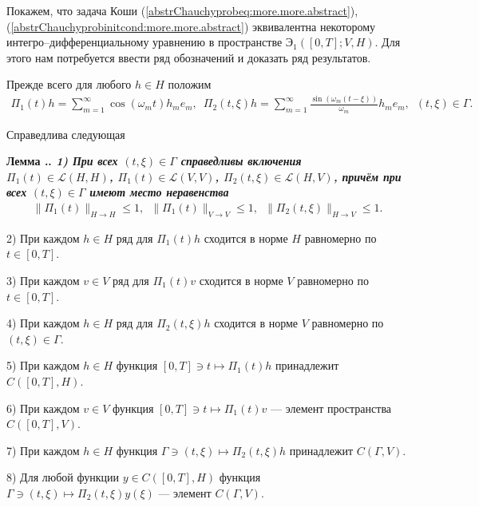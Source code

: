 \documentclass{report}
\newcounter{lem}[section]
\renewcommand{\thelem}{\thesection.\arabic{lem}}
\newenvironment{Lemma}{\par\refstepcounter{lem}\bf Лемма \thelem. \it}{\rm\par}
\begin{document}
Покажем, что задача Коши (\ref{abstrChauchyprobeq:more.more.abstract}), (\ref{abstrChauchyprobinitcond:more.more.abstract}) эквивалентна некоторому интегро--дифференциальному уравнению в
пространстве ${\textbf{Э}}_1([0,T];V,H)$. Для этого нам потребуется ввести ряд обозначений и доказать ряд результатов.

Прежде всего для любого $h\in H$ положим
\begin{gather*}
\Pi_1(t)h=\sum\limits_{m=1}^\infty\cos(\omega_mt)h_me_m,\,\,\,\Pi_2(t,\xi)h=\sum\limits_{m=1}^\infty\frac{\sin(\omega_m(t-\xi))}{\omega_m}h_me_m,\,\,\,(t,\xi)\in\Gamma.
\end{gather*}

Справедлива следующая
\begin{Lemma}\label{Pi1Pi2_properties:more.more.abstract}
1) При всех $(t,\xi)\in\Gamma$ справедливы включения $\Pi_1(t)\in\mathcal{L}(H,H)$, $\Pi_1(t)\in\mathcal{L}(V,V)$, $\Pi_2(t,\xi)\in\mathcal{L}(H,V)$, причём при всех $(t,\xi)\in\Gamma$
имеют место неравенства
\begin{gather*}
\|\Pi_1(t)\|_{H\to H}\leqslant1,\,\,\,\|\Pi_1(t)\|_{V\to V}\leqslant1,\,\,\,\|\Pi_2(t,\xi)\|_{H\to V}\leqslant1.
\end{gather*}

2) При каждом $h\in H$ ряд для $\Pi_1(t)h$ сходится в норме $H$ равномерно по $t\in[0,T]$.

3) При каждом $v\in V$ ряд для $\Pi_1(t)v$ сходится в норме $V$ равномерно по $t\in[0,T]$.

4) При каждом $h\in H$ ряд для $\Pi_2(t,\xi)h$ сходится в норме $V$ равномерно по $(t,\xi)\in\Gamma$.

5) При каждом $h\in H$ функция $[0,T]\ni t\mapsto\Pi_1(t)h$ принадлежит $C([0,T],H)$.

6) При каждом $v\in V$ функция $[0,T]\ni t\mapsto\Pi_1(t)v$ --- элемент пространства $C([0,T],V)$.

7) При каждом $h\in H$ функция $\Gamma\ni(t,\xi)\mapsto\Pi_2(t,\xi)h$ принадлежит $C(\Gamma,V)$.

8) Для любой функции $y\in C([0,T],H)$ функция $\Gamma\ni (t,\xi)\mapsto \Pi_2(t,\xi)y(\xi)$ --- элемент $C(\Gamma,V)$.
\end{Lemma}
\end{document}

